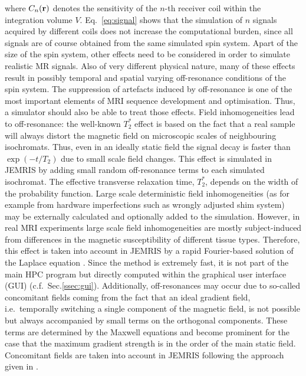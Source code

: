 \documentclass[journal,onecolumn,12pt]{IEEEtran}
\begin{document}
where $C_n({\bf r})$ denotes the sensitivity of the $n$-th receiver coil within the integration volume
$V$. Eq.~\ref{eq:signal} shows that the simulation of $n$ signals acquired by different coils does not increase the
computational burden, since all signals are of course obtained from the same simulated spin system. Apart of the size of
the spin system, other effects need to be considered in order to simulate realistic MR signals. Also of very different
physical nature, many of these effects result in possibly temporal and spatial varying off-resonance conditions of the
spin system. The suppression of artefacts induced by off-resonance is one of the most important elements of MRI sequence
development and optimisation. Thus, a simulator should also be able to treat those effects. Field inhomogeneities lead
to off-resonance: the well-known $T_{2}^{*}$ effect is based on the fact that a real sample will always distort the
magnetic field on microscopic scales of neighbouring isochromats. Thus, even in an ideally static field the signal decay
is faster than $\exp(-t/T_2)$ due to small scale field changes. This effect is simulated in JEMRIS by adding small
random off-resonance terms to each simulated isochromat. The effective transverse relaxation time, $T_{2}^{*}$, depends
on the width of the probability function. Large scale deterministic field inhomogeneities (as for example from hardware
imperfections such as wrongly adjusted shim system) may be externally calculated and optionally added to the
simulation. However, in real MRI experiments large scale field inhomogeneities are mostly subject-induced from
differences in the magnetic susceptibility of different tissue types. Therefore, this effect is taken into account in
JEMRIS by a rapid Fourier-based solution of the Laplace equation \cite{marques}. Since the method is extremely fast, it
is not part of the main HPC program but directly computed within the graphical user interface (GUI)
(c.f.~Sec.\ref{ssec:gui}). Additionally, off-resonances may occur due to so-called concomitant fields coming from the
fact that an ideal gradient field, i.e.~temporally switching a single component of the magnetic field, is not possible
but always accompanied by small terms on the orthogonal components. These terms are determined by the Maxwell equations
and become prominent for the case that the maximum gradient strength is in the order of the main static
field. Concomitant fields are taken into account in JEMRIS following the approach given in \cite{bernstein}.

\end{document}
